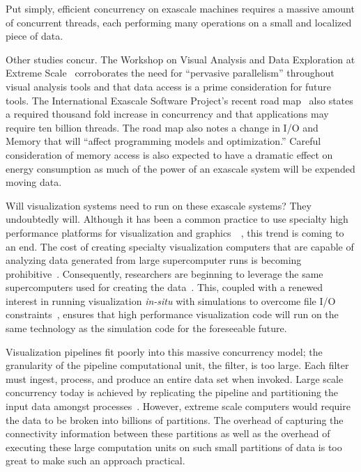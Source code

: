 \documentclass{vgtc}                          %
\newcommand*{\lcite}[1]{~\cite{#1}}
\begin{document}
Put simply, efficient concurrency on exascale machines requires a massive
amount of concurrent threads, each performing many operations on a small
and localized piece of data.

Other studies concur.  The Workshop on Visual Analysis and Data Exploration
at Extreme Scale\lcite{VisAnalysisExtremeScale} corroborates the need for
``pervasive parallelism'' throughout visual analysis tools and that data
access is a prime consideration for future tools.  The International
Exascale Software Project's recent road map\lcite{ExascaleRoadMap} also
states a required thousand fold increase in concurrency and that
applications may require ten billion threads.  The road map also notes a
change in I/O and Memory that will ``affect programming models and
optimization.''  Careful consideration of memory access is also expected
to have a dramatic effect on energy consumption as much of the power of an
exascale system will be expended moving data.

Will visualization systems need to run on these exascale systems?  They
undoubtedly will.  Although it has been a common practice to use specialty
high performance platforms for visualization and graphics~\lcite{Wylie01},
this trend is coming to an end.  The cost of creating specialty
visualization computers that are capable of analyzing data generated from
large supercomputer runs is becoming prohibitive\lcite{Childs07}.
Consequently, researchers are beginning to leverage the same supercomputers
used for creating the data\lcite{Peterka09:SC,Peterka09:SciDAC,Yu08}.
This, coupled with a renewed interest in running visualization
\emph{in-situ} with simulations to overcome file I/O
constraints\lcite{SNL092014,Tu06,Ross08}, ensures that high performance
visualization code will run on the same technology as the simulation code
for the foreseeable future.

Visualization pipelines fit poorly into this massive concurrency model; the
granularity of the pipeline computational unit, the filter, is too large.
Each filter must ingest, process, and produce an entire data set when
invoked.  Large scale concurrency today is achieved by replicating the
pipeline and partitioning the input data amongst processes\lcite{Ahrens00}.
However, extreme scale computers would require the data to be broken into
billions of partitions.  The overhead of capturing the connectivity
information between these partitions as well as the overhead of executing
these large computation units on such small partitions of data is too great
to make such an approach practical.
\end{document}
